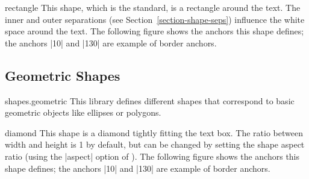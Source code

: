 \begin{shape}{rectangle}
  This shape, which is the standard, is a rectangle around the
  text. The inner   and outer separations (see
  Section~\ref{section-shape-seps}) influence the white space around
  the text. The following figure shows the anchors this
  shape defines; the anchors |10| and |130| are example of border anchors.
\begin{codeexample}[]
\Huge
{}
\end{codeexample}
\end{shape}


\subsection{Geometric Shapes}

\begin{pgflibrary}{shapes.geometric}
  This library defines different shapes that correspond to basic
  geometric objects like ellipses or polygons.
\end{pgflibrary}


\begin{shape}{diamond}
  This shape is a diamond tightly fitting the text box. The ratio
  between width and height is 1 by default, but can be changed by
  setting the shape aspect ratio (using the |aspect| option of
  \tikzname). The following figure shows the anchors this
  shape defines; the anchors |10| and |130| are example of border anchors.
\begin{codeexample}[]
\Huge
{}
\end{codeexample}
\end{shape}


